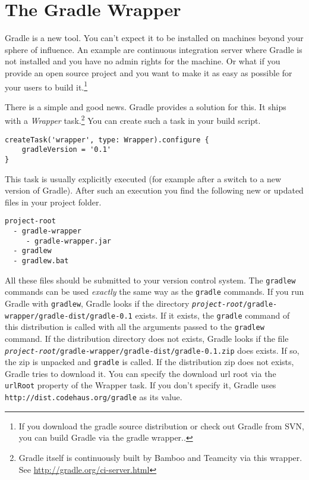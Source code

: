 \chapter{The Gradle Wrapper} %
\label{cha:the_gradle_wrapper}
Gradle is a new tool. You can't expect it to be installed on machines beyond your sphere of influence. An example are continuous integration server where Gradle is not installed and you have no admin rights for the machine. Or what if you provide an open source project and you want to make it as easy as possible for your users to build it.\footnote{If you download the gradle source distribution or check out Gradle from SVN, you can build Gradle via the gradle wrapper..}

There is a simple and good news. Gradle provides a solution for this. It ships with a \emph{Wrapper} task.\footnote{Gradle itself is continuously built by Bamboo and Teamcity via this wrapper. See \url{http://gradle.org/ci-server.html}} You can create such a task in your build script.
\begin{Verbatim}
createTask('wrapper', type: Wrapper).configure {
    gradleVersion = '0.1'
}	
\end{Verbatim}
This task is usually explicitly executed (for example after a switch to a new version of Gradle). After such an execution you find the following new or updated files in your project folder.
\begin{Verbatim}
project-root
  - gradle-wrapper
     - gradle-wrapper.jar
  - gradlew
  - gradlew.bat
\end{Verbatim}
\noindent
All these files should be submitted to your version control system. The \texttt{gradlew} commands can be used \emph{exactly} the same way as the \texttt{gradle} commands. If you run Gradle with \texttt{gradlew}, Gradle looks if the directory \texttt{\emph{project-root}/gradle-wrapper/gradle-dist/gradle-0.1} exists. If it exists, the \texttt{gradle} command of this distribution is called with all the arguments passed to the \texttt{gradlew} command.
If the distribution directory does not exists, Gradle looks if the file \texttt{\emph{project-root}/gradle-wrapper/gradle-dist/gradle-0.1.zip} does exists. If so, the zip is unpacked and \texttt{gradle} is called. If the distribution zip does not exists, Gradle tries to download it. You can specify the download url root via the \texttt{urlRoot} property of the Wrapper task. If you don't specify it, Gradle uses \texttt{http://dist.codehaus.org/gradle} as its value. 

